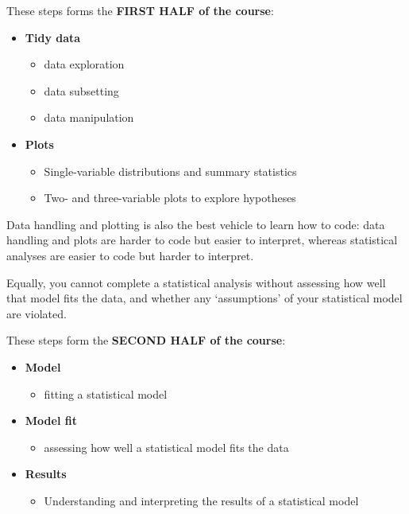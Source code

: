 \documentclass[
]{book}
\providecommand{\tightlist}{%
  \setlength{\itemsep}{0pt}\setlength{\parskip}{0pt}}
\begin{document}
These steps forms the \textbf{FIRST HALF of the course}:

\begin{itemize}
\tightlist
\item
  \textbf{Tidy data}

  \begin{itemize}
  \tightlist
  \item
    data exploration
  \item
    data subsetting
  \item
    data manipulation
  \end{itemize}
\item
  \textbf{Plots}

  \begin{itemize}
  \tightlist
  \item
    Single-variable distributions and summary statistics
  \item
    Two- and three-variable plots to explore hypotheses
  \end{itemize}
\end{itemize}

Data handling and plotting is also the best vehicle to learn how to
code: data handling and plots are harder to code but easier to interpret,
whereas statistical analyses are easier to code but harder to interpret.

Equally, you cannot complete a statistical analysis without assessing how well
that model fits the data, and whether any `assumptions' of your statistical
model are violated.

These steps form the \textbf{SECOND HALF of the course}:

\begin{itemize}
\tightlist
\item
  \textbf{Model}

  \begin{itemize}
  \tightlist
  \item
    fitting a statistical model
  \end{itemize}
\item
  \textbf{Model fit}

  \begin{itemize}
  \tightlist
  \item
    assessing how well a statistical model fits the data
  \end{itemize}
\item
  \textbf{Results}

  \begin{itemize}
  \tightlist
  \item
    Understanding and interpreting the results of a statistical model
  \end{itemize}
\end{itemize}
\end{document}
